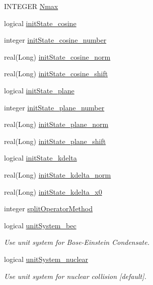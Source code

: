 \begin{DoxyCompactItemize}
INTEGER \hyperlink{namespaceinput__parameters_a29545f09a06c5a3def5df7fdb5f966ab}{Nmax}
\item 
logical \hyperlink{namespaceinput__parameters_a794b8486b7ecd6258448887bce533681}{initState\_\-cosine}
\item 
integer \hyperlink{namespaceinput__parameters_ad5ff3d9c110be99ed08bbe970f1630c8}{initState\_\-cosine\_\-number}
\item 
real(Long) \hyperlink{namespaceinput__parameters_a51d2cc916f531fadef1a6f0729644174}{initState\_\-cosine\_\-norm}
\item 
real(Long) \hyperlink{namespaceinput__parameters_ac3a5530df841dc82b4819f34f1e44980}{initState\_\-cosine\_\-shift}
\item 
logical \hyperlink{namespaceinput__parameters_a727a13be305b5dde7955fd2d02f955e4}{initState\_\-plane}
\item 
integer \hyperlink{namespaceinput__parameters_a876ac6edc93b733aeb66f54aca167741}{initState\_\-plane\_\-number}
\item 
real(Long) \hyperlink{namespaceinput__parameters_a22ba3f1343580a0db34433e32279e365}{initState\_\-plane\_\-norm}
\item 
real(Long) \hyperlink{namespaceinput__parameters_a97253a3c66d919b8a99dd33c633d3bd8}{initState\_\-plane\_\-shift}
\item 
logical \hyperlink{namespaceinput__parameters_aae45dd03716b9ad9a0600a9d9a798935}{initState\_\-kdelta}
\item 
real(Long) \hyperlink{namespaceinput__parameters_a1b2e5c088ab1d39d896586d7fb18b142}{initState\_\-kdelta\_\-norm}
\item 
real(Long) \hyperlink{namespaceinput__parameters_a65eb9165c6a1fd054daefc2a96e7ae2a}{initState\_\-kdelta\_\-x0}
\item 
integer \hyperlink{namespaceinput__parameters_a127f71f45eade1f05ced1535e88c771d}{splitOperatorMethod}
\item 
logical \hyperlink{namespaceinput__parameters_a716cb07ce1fca722dacc327ddc4011fd}{unitSystem\_\-bec}
\begin{DoxyCompactList}\small\item\em Use unit system for Bose-\/Einstein Condensate. \item\end{DoxyCompactList}\item 
logical \hyperlink{namespaceinput__parameters_a65ef9c71ef768c5f3b871cae9143108e}{unitSystem\_\-nuclear}
\begin{DoxyCompactList}\small\item\em Use unit system for nuclear collision \mbox{[}default\mbox{]}. \item\end{DoxyCompactList}\item 

\end{DoxyCompactItemize}
